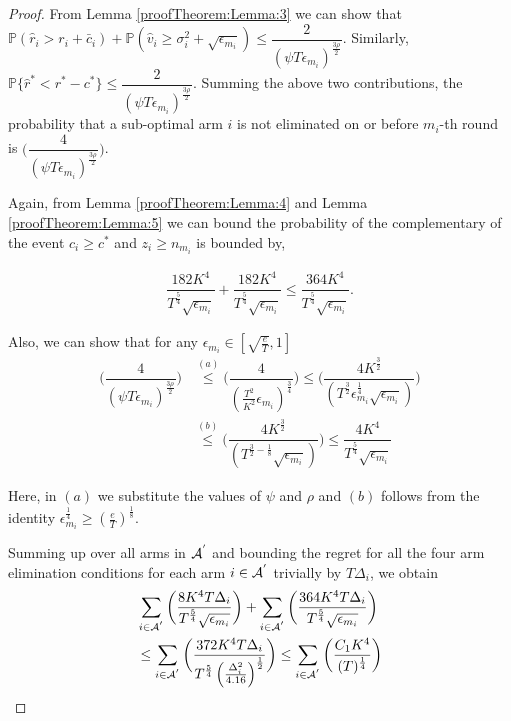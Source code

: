 \begin{proof}

From Lemma \ref{proofTheorem:Lemma:3} we can show that $\mathbb{P}\left( \hat{r}_{i} > r_{i}+ \bar{c}_i\right) + \mathbb{P}\left( \hat{v}_{i}\geq \sigma_{i}^{2}+\sqrt{\epsilon_{m_{i}}}\right) \leq \dfrac{2}{(\psi  T\epsilon_{m_{i}})^{\frac{3\rho}{2}}}$. Similarly, $\mathbb{P}\lbrace\hat{r}^{*} < r^{*} - c^{*}\rbrace \leq \dfrac{2}{(\psi  T\epsilon_{m_{i}})^{\frac{3\rho}{2}}}$. Summing the above two contributions, the probability that a sub-optimal arm ${i}$ is not eliminated on or before $m_{i}$-th round is  $\bigg(\dfrac{4}{(\psi T\epsilon_{m_{i}})^{\frac{3\rho}{2}}} \bigg)$.

Again, from Lemma \ref{proofTheorem:Lemma:4} and Lemma \ref{proofTheorem:Lemma:5} we can bound the probability of the  complementary of the event $c_{i} \geq c^* $ and $ z_i \geq n_{m_i}$ is bounded by,

\begin{align*}
\dfrac{182 K^4}{T^{\frac{5}{4}}\sqrt{\epsilon_{m_i}}} + \dfrac{182 K^4}{T^{\frac{5}{4}}\sqrt{\epsilon_{m_i}}}\leq \dfrac{364 K^4}{T^{\frac{5}{4}}\sqrt{\epsilon_{m_i}}}.
\end{align*}

Also, we can show that for any $\epsilon_{m_i}\in[\sqrt{\frac{e}{T}},1]$
\begin{align*}
\bigg(\dfrac{4}{(\psi T\epsilon_{m_{i}})^{\frac{3\rho}{2}}} \bigg) &\overset{(a)}{\leq} \bigg(\dfrac{4}{(\frac{T^2}{K^2}\epsilon_{m_{i}})^{\frac{3}{4}}} \bigg)\leq \bigg(\dfrac{4 K^{\frac{3}{2}}}{(T^\frac{3}{2} \epsilon_{m_i}^{\frac{1}{4}}\sqrt{\epsilon_{m_{i}}})}\bigg)\\
 &\overset{(b)}{\leq} \bigg(\dfrac{4 K^{\frac{3}{2}}}{(T^{\frac{3}{2}-\frac{1}{8}}\sqrt{\epsilon_{m_{i}}})}  \bigg)
\leq \dfrac{4 K^4}{T^{\frac{5}{4}}\sqrt{\epsilon_{m_i}}}
\end{align*}

Here, in $(a)$ we substitute the values of $\psi$ and $\rho$ and $(b)$ follows from the identity $\epsilon_{m_i}^{\frac{1}{4}}\geq (\frac{e}{T})^{\frac{1}{8}} $.

Summing up over all arms in $\mathcal{A}^{'}$ and bounding the regret for all the four arm elimination conditions for each arm $i\in \mathcal{A}^{'}$ trivially by $T\Delta_{i}$, we obtain
	\begin{align*}
&\sum_{i\in \mathcal{A}^{'}}\bigg(\dfrac{8 K^4 T\Delta_i}{T^{\frac{5}{4}}\sqrt{\epsilon_{m_i}}}\bigg) + \sum_{i\in \mathcal{A}^{'}}\bigg(\dfrac{364 K^4 T\Delta_i}{T^{\frac{5}{4}}\sqrt{\epsilon_{m_i}}}\bigg)\\
&\leq\sum_{i\in \mathcal{A}^{'}}\bigg(\dfrac{372 K^4 T\Delta_{i}}{T^{\frac{5}{4}}\left(\frac{\Delta_{i}^{2}}{4.16}\right)^{\frac{1}{2}}}\bigg)
\leq \sum_{i\in \mathcal{A}^{'}}\bigg(\dfrac{C_1 K^4}{(T)^{\frac{1}{4}}}\bigg)\\  
	\end{align*}


\end{proof}
